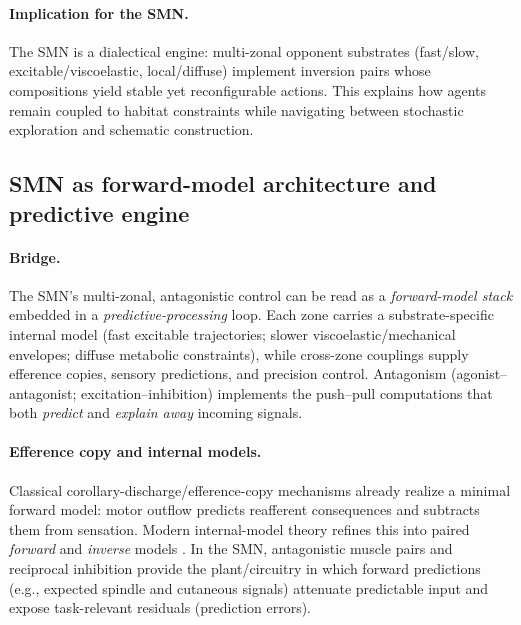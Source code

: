\paragraph{Implication for the SMN.}
The SMN is a dialectical engine: multi-zonal opponent substrates (fast/slow, excitable/viscoelastic, local/diffuse) implement inversion pairs whose compositions yield stable yet reconfigurable actions. This explains how agents remain coupled to habitat constraints while navigating between stochastic exploration and schematic construction.


\subsection{SMN as forward-model architecture and predictive engine}
\label{subsec:smn_forward_predictive}

\paragraph{Bridge.}
The SMN’s multi-zonal, antagonistic control can be read as a \emph{forward-model stack} embedded in a \emph{predictive-processing} loop. Each zone carries a substrate-specific internal model (fast excitable trajectories; slower viscoelastic/mechanical envelopes; diffuse metabolic constraints), while cross-zone couplings supply efference copies, sensory predictions, and precision control. Antagonism (agonist--antagonist; excitation--inhibition) implements the push--pull computations that both \emph{predict} and \emph{explain away} incoming signals.

\paragraph{Efference copy and internal models.}
Classical corollary-discharge/efference-copy mechanisms \citep{vonHolst1950_Reafference,Sperry1950_Corollary} already realize a minimal forward model: motor outflow predicts reafferent consequences and subtracts them from sensation. Modern internal-model theory refines this into paired \emph{forward} and \emph{inverse} models \citep{JordanRumelhart1992_ForwardInverse,WolpertKawato1998_MultipleModels}. In the SMN, antagonistic muscle pairs and reciprocal inhibition provide the plant/circuitry in which forward predictions (e.g., expected spindle and cutaneous signals) attenuate predictable input and expose task-relevant residuals (prediction errors).

